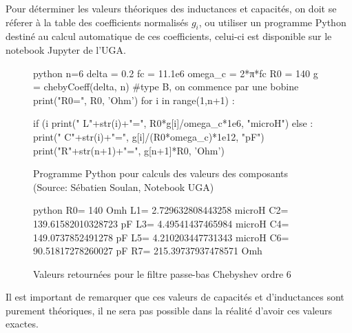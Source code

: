 \begin{itemize}
        \begin{figure}[!htbp]
         
        \end{figure}
        \FloatBarrier
        
        \begin{flushleft}
            Pour déterminer les valeurs théoriques des inductances et capacités, on doit se réferer à la table des coefficients normalisés $g_i$, ou utiliser un programme Python destiné au calcul automatique de ces coefficients, celui-ci est disponible sur le notebook Jupyter de l'UGA.
        \end{flushleft}
        \newpage
        
        \begin{figure}[!htbp]
        \begin{mintedbox}{python}
n=6
delta = 0.2
fc = 11.1e6
omega_c = 2*π*fc
R0 = 140
g = chebyCoeff(delta, n)
#type B, on commence par une bobine
print("R0=", R0, 'Ohm')
for i in range(1,n+1) :
    
    if (i %
        print("  L"+str(i)+"=", R0*g[i]/omega_c*1e6, "microH")
    else :
        print("  C"+str(i)+"=", g[i]/(R0*omega_c)*1e12, "pF")
print("R"+str(n+1)+"=", g[n+1]*R0, 'Ohm')\end{mintedbox}
        \caption{Programme Python pour calculs des valeurs des composants (Source: Sébatien Soulan, Notebook UGA)}
        \end{figure}
        \FloatBarrier
        
        \begin{figure}[!htbp]
        \begin{mintedbox}{python}
R0= 140 Omh
  L1= 2.729632808443258 microH
  C2= 139.61582010328723 pF
  L3= 4.49541437465984 microH
  C4= 149.0737852491278 pF
  L5= 4.210203447731343 microH
  C6= 90.51817278260027 pF
R7= 215.39737937478571 Omh\end{mintedbox}
        \caption{Valeurs retournées pour le filtre passe-bas Chebyshev ordre 6}
        \end{figure}
        \FloatBarrier
        \begin{flushleft}
            Il est important de remarquer que ces valeurs de capacités et d'inductances sont purement théoriques, il ne sera pas possible dans la réalité d'avoir ces valeurs exactes.
        \end{flushleft}
\end{itemize}

